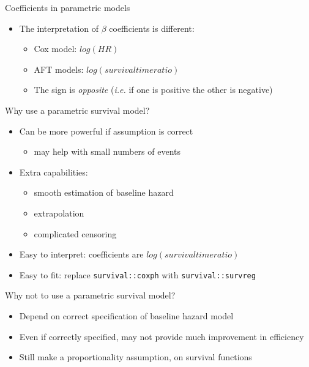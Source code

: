 \documentclass[
  ignorenonframetext,
]{beamer}
\providecommand{\tightlist}{%
  \setlength{\itemsep}{0pt}\setlength{\parskip}{0pt}}
\begin{document}
\begin{frame}{Coefficients in parametric models}
\protect\hypertarget{coefficients-in-parametric-models}{}

\begin{itemize}
\tightlist
\item
  The interpretation of \(\beta\) coefficients is different:

  \begin{itemize}
  \tightlist
  \item
    Cox model: \(log(HR)\)
  \item
    AFT models: \(log(survival time ratio)\)
  \item
    The sign is \emph{opposite} (\emph{i.e.} if one is positive the
    other is negative)
  \end{itemize}
\end{itemize}

\end{frame}

\begin{frame}[fragile]{Why use a parametric survival model?}
\protect\hypertarget{why-use-a-parametric-survival-model}{}

\begin{itemize}
\tightlist
\item
  Can be more powerful if assumption is correct

  \begin{itemize}
  \tightlist
  \item
    may help with small numbers of events
  \end{itemize}
\item
  Extra capabilities:

  \begin{itemize}
  \tightlist
  \item
    smooth estimation of baseline hazard
  \item
    extrapolation
  \item
    complicated censoring
  \end{itemize}
\item
  Easy to interpret: coefficients are \(log(survival time ratio)\)
\item
  Easy to fit: replace \texttt{survival::coxph} with
  \texttt{survival::survreg}
\end{itemize}

\end{frame}

\begin{frame}{Why not to use a parametric survival model?}
\protect\hypertarget{why-not-to-use-a-parametric-survival-model}{}

\begin{itemize}
\tightlist
\item
  Depend on correct specification of baseline hazard model
\item
  Even if correctly specified, may not provide much improvement in
  efficiency
\item
  Still make a proportionality assumption, on survival functions
\end{itemize}

\end{frame}
\end{document}
